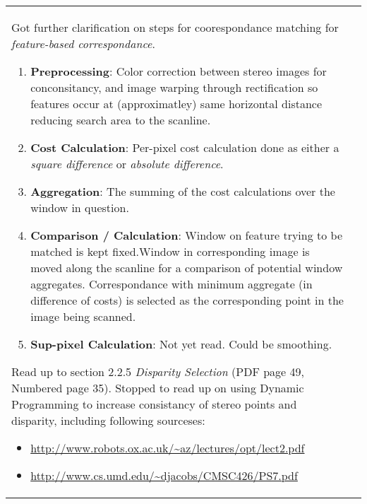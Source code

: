 \documentclass[a4paper,10pt]{article}
\begin{document}
\begin{longtable}{l p{12cm} }
{\par Got further clarification on steps for coorespondance matching for \textit{feature-based correspondance}.\newline
\par\begin{enumerate}
\item \textbf{Preprocessing}: Color correction between stereo images for conconsitancy, and image warping through rectification so features occur at (approximatley) same horizontal distance reducing search area to the scanline.
\item \textbf{Cost Calculation}: Per-pixel cost calculation done as either a \textit{square difference} or \textit{absolute difference}.
\item \textbf{Aggregation}: The summing of the cost calculations over the window in question.
\item \textbf{Comparison / Calculation}: Window on feature trying to be matched is kept fixed.Window in corresponding image  is moved along the scanline for a comparison of potential window aggregates. Correspondance with minimum aggregate (in difference of costs) is selected as the corresponding point in the image being scanned.
\item \textbf{Sup-pixel Calculation}: Not yet read. Could be smoothing.\newline
\end{enumerate}
\par Read up to section 2.2.5 \textit{Disparity Selection} (PDF page 49, Numbered page 35). Stopped to read up on using Dynamic Programming to increase consistancy of stereo points and disparity, including following sourceses:\newline
\par\begin{itemize}
\item \url{http://www.robots.ox.ac.uk/~az/lectures/opt/lect2.pdf}
\item \url{http://www.cs.umd.edu/~djacobs/CMSC426/PS7.pdf}
\end{itemize}

}
\end{longtable}
\end{document}
